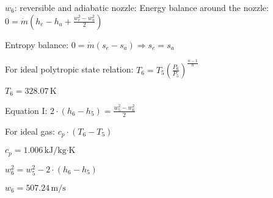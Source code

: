 \( w_6 \): reversible and adiabatic nozzle:  
Energy balance around the nozzle:  
\( 0 = \dot{m} (h_e - h_a + \frac{w_e^2 - w_a^2}{2}) \)  

Entropy balance:  
\( 0 = \dot{m} (s_e - s_a) \Rightarrow s_e = s_a \)  

For ideal polytropic state relation:  
\( T_6 = T_5 \left( \frac{P_6}{P_5} \right)^{\frac{n-1}{n}} \)  

\( T_6 = 328.07 \, \text{K} \)  

Equation I:  
\( 2 \cdot (h_6 - h_5) = \frac{w_5^2 - w_6^2}{2} \)  

For ideal gas:  
\( c_p \cdot (T_6 - T_5) \)  

\( c_p = 1.006 \, \text{kJ/kg·K} \)  

\( w_6^2 = w_5^2 - 2 \cdot (h_6 - h_5) \)  

\( w_6 = 507.24 \, \text{m/s} \)